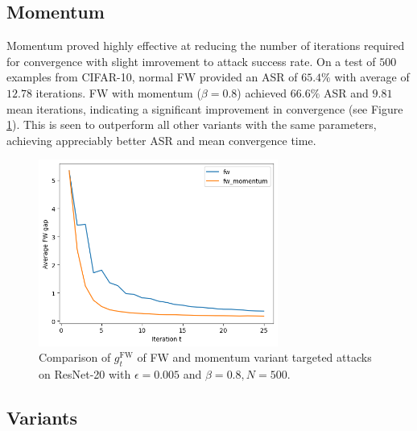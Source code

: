 \documentclass{article}
\begin{document}
\subsection{Momentum}

Momentum proved highly effective at reducing the number of iterations required for convergence with slight imrovement to attack success rate. On a test of $500$ examples from CIFAR-10, normal FW provided an ASR of $65.4\%$ with average of $12.78$ iterations. FW with momentum ($\beta = 0.8$) achieved $66.6\%$ ASR and $9.81$ mean iterations, indicating a significant improvement in convergence (see Figure \ref{fig:momentum}). This is seen to outperform all other variants with the same parameters, achieving appreciably better ASR and mean convergence time.

\begin{figure}[H]
    \centering
    \includegraphics[width=0.7\textwidth]{plots/momentum.png}
    \caption{Comparison of $g_t^\text{FW}$ of FW and momentum variant targeted attacks on ResNet-20 with $\epsilon = 0.005$ and $\beta = 0.8, N = 500$.}
    \label{fig:momentum}
\end{figure}

\subsection{Variants}
\end{document}
